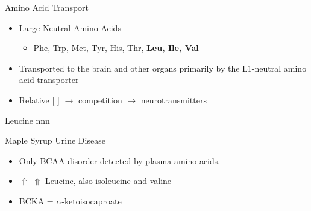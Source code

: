 \documentclass[presentation, smaller]{beamer}
\begin{document}
\begin{frame}[label={sec:orgheadline5}]{Amino Acid Transport}
\begin{itemize}
\item Large Neutral Amino Acids
\begin{itemize}
\item Phe, Trp, Met, Tyr, His, Thr, \textbf{Leu, Ile, Val}
\end{itemize}
\item Transported to the brain and other organs primarily by the
L1-neutral amino acid transporter
\item Relative [ ] \(\to\) competition \(\to\) neurotransmitters
\end{itemize}
\end{frame}
\begin{frame}[label={sec:orgheadline6}]{Leucine}
nnn
\end{frame}
\begin{frame}[label={sec:orgheadline7}]{Maple Syrup Urine Disease}
\begin{itemize}
\item Only BCAA disorder detected by plasma amino acids.
\item \(\Uparrow\) \(\Uparrow\) Leucine, also isoleucine and valine
\item BCKA = \(\alpha\)-ketoisocaproate
\end{itemize}
\end{frame}
\end{document}
